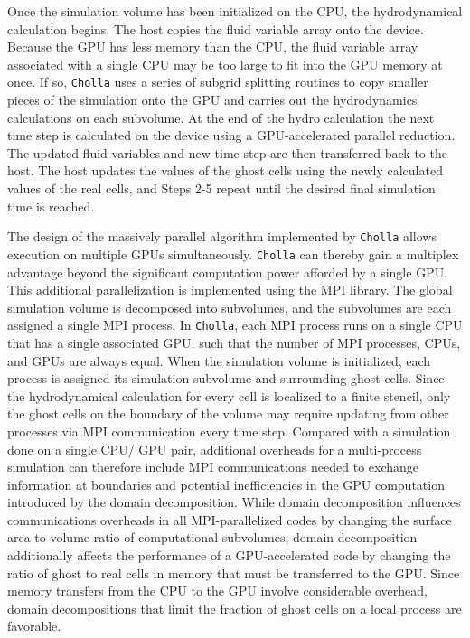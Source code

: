 \documentclass[11pt,letterpaper,english]{article}
\begin{document}
Once the simulation volume has been initialized on the CPU, the hydrodynamical calculation begins. The host copies the fluid variable array onto the device. Because the GPU has less memory than the CPU, the fluid variable array associated with a single CPU may be too large to fit into the GPU memory at once. If so, {\tt Cholla} uses a series of 
subgrid splitting routines to copy smaller pieces of the simulation onto the GPU and carries out the hydrodynamics calculations on each subvolume. At the end of the hydro calculation the next time step is calculated on the device using a GPU-accelerated parallel reduction. The updated fluid variables and new time step are then transferred back to the host. The host updates the values of the ghost cells using the newly calculated values of the real cells, and Steps 2-5 repeat until the desired final simulation time is reached.

The design of the massively parallel algorithm implemented by {\tt Cholla} allows execution on multiple GPUs simultaneously. {\tt Cholla} can thereby gain a multiplex advantage beyond the significant computation power afforded by a single GPU. This additional parallelization is implemented using the MPI library. The global simulation volume is decomposed into subvolumes, and the subvolumes are each assigned a single MPI process. In {\tt Cholla}, each MPI process runs on a single CPU that has a single associated GPU, such that the number of MPI processes, CPUs, and GPUs are always equal. When the simulation volume is initialized, each process is assigned its simulation subvolume and surrounding ghost cells. Since the hydrodynamical calculation for every cell is localized to a finite stencil, only the ghost cells on the boundary of the volume may require updating from other processes via MPI communication every time step. Compared with a simulation done on a single CPU/ GPU pair, additional overheads for a multi-process simulation can therefore include MPI communications needed to exchange information at boundaries and potential inefficiencies in the GPU computation introduced by the domain decomposition. While domain decomposition influences communications overheads in all MPI-parallelized codes by changing the surface area-to-volume ratio of computational subvolumes, domain decomposition additionally affects the performance of a GPU-accelerated code by changing the ratio of ghost to real cells in memory that must be transferred to the GPU. Since memory transfers from the CPU to the GPU involve considerable overhead, domain decompositions that limit the fraction of ghost cells on a local process are favorable.
\end{document}
